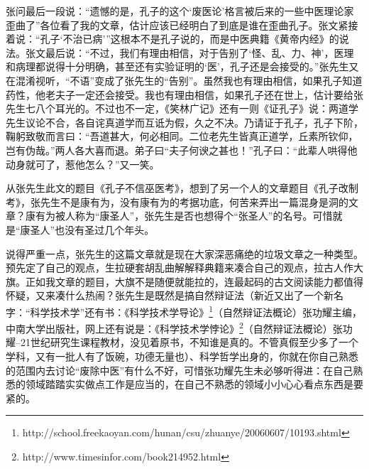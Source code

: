 张问最后一段说：“遗憾的是，孔子的这个‘废医论’格言被后来的一些中医理论家歪曲了”各位看了我的文章，估计应该已经明白了到底是谁在歪曲孔子。张文紧接着说：“孔子‘不治已病’”这根本不是孔子说的，而是中医典籍《黄帝内经》的说法。张文最后说：“不过，我们有理由相信，对于告别了‘怪、乱、力、神’，医理和病理都说得十分明确，甚至还有实验证明的‘医’，孔子还是会接受的。”张先生又在混淆视听，“不语”变成了张先生的“告别”。虽然我也有理由相信，如果孔子知道药性，他老夫子一定还会接受。我也有理由相信，如果孔子还在世上，估计要给张先生七八个耳光的。不过也不一定，《笑林广记》还有一则《证孔子》说：两道学先生议论不合，各自诧真道学而互诋为假，久之不决。乃请证于孔子，孔子下阶，鞠躬致敬而言曰：“吾道甚大，何必相同。二位老先生皆真正道学，丘素所钦仰，岂有伪哉。”两人各大喜而退。弟子曰“夫子何谀之甚也！”孔子曰：“此辈人哄得他动身就可了，惹他怎么？”又一笑。

从张先生此文的题目《孔子不信巫医考》，想到了另一个人的文章题目《孔子改制考》，张先生不是康有为，没有康有为的考据功底，何苦来弄出一篇混身是洞的文章？康有为被人称为“康圣人”，张先生是否也想得个“张圣人”的名号。可惜就是“康圣人”也没有圣过几个年头。

说得严重一点，张先生的这篇文章就是现在大家深恶痛绝的垃圾文章之一种类型。预先定了自己的观点，生拉硬套胡乱曲解解释典籍来凑合自己的观点，拉古人作大旗。正如我文章的题目，大旗不是随便就能拉的，连最起码的古文阅读能力都值得怀疑，又来凑什么热闹？张先生是既然是搞自然辩证法（新近又出了一个新名字：“科学技术学”还有书：《科学技术学导论》\footnote{http://school.freekaoyan.com/hunan/csu/zhuanye/20060607/10193.shtml}（自然辩证法概论）张功耀主编，中南大学出版社，网上还有说是：《科学技术学悖论》\footnote{http://www.timesinfor.com/book214952.html}（自然辩证法概论）张功耀--21世纪研究生课程教材，没见着原书，不知谁是真的。不管真假至少多了一个学科，又有一批人有了饭碗，功德无量也）、科学哲学出身的，你就在你自己熟悉的范围内去讨论“废除中医”有什么不好，可惜张功耀先生未必够听得进：在自己熟悉的领域踏踏实实做点工作是应当的，在自己不熟悉的领域小小心心看点东西是要紧的。
